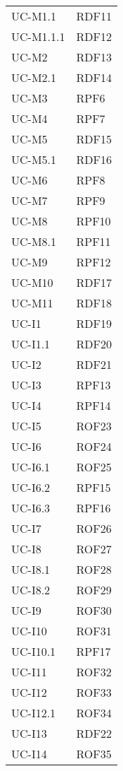 \begin{longtable}{| p{5cm} | p{5cm} |}
		\rowcolor{LightGray}
		UC-M1.1 & RDF11\\
		UC-M1.1.1 & RDF12\\
		\rowcolor{LightGray}
		UC-M2 & RDF13 \\
		\rowcolor{LightGray}
		UC-M2.1 & RDF14 \\
		UC-M3 & RPF6 \\
		\rowcolor{LightGray}
		UC-M4 & RPF7\\
		UC-M5 & RDF15 \\
		\rowcolor{LightGray}
		UC-M5.1 & RDF16 \\
		UC-M6 & RPF8 \\
		\rowcolor{LightGray}
		UC-M7 & RPF9 \\
		UC-M8 & RPF10\\
		\rowcolor{LightGray}
		UC-M8.1 & RPF11\\
		UC-M9 & RPF12\\
		\rowcolor{LightGray}
		UC-M10 & RDF17\\
		UC-M11 & RDF18\\
		\rowcolor{LightGray}
		UC-I1 & RDF19 \\
		UC-I1.1 & RDF20 \\
		\rowcolor{LightGray}
		UC-I2 & RDF21 \\
		UC-I3 & RPF13 \\
		\rowcolor{LightGray}
		UC-I4 & RPF14 \\
		UC-I5 & ROF23\\
		\rowcolor{LightGray}
		UC-I6 & ROF24 \\
		UC-I6.1 & ROF25 \\
		\rowcolor{LightGray}
		UC-I6.2 & RPF15 \\
		UC-I6.3 & RPF16 \\
		\rowcolor{LightGray}
		UC-I7 & ROF26\\
		UC-I8 & ROF27 \\
		\rowcolor{LightGray}
		UC-I8.1 & ROF28 \\
		UC-I8.2 & ROF29 \\
		\rowcolor{LightGray}
		UC-I9 & ROF30 \\
		UC-I10 & ROF31 \\
		\rowcolor{LightGray}
		UC-I10.1 & RPF17 \\
		UC-I11 & ROF32 \\
		\rowcolor{LightGray}
		UC-I12 & ROF33 \\
		UC-I12.1 & ROF34 \\
		\rowcolor{LightGray}		
		UC-I13 & RDF22 \\
		UC-I14 & ROF35 \\

\end{longtable}
